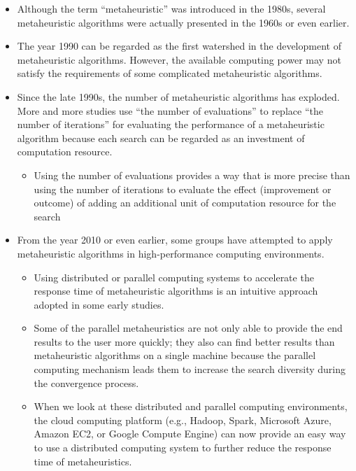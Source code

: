 \documentclass[
  letterpaper,
  DIV=11,
  numbers=noendperiod]{scrreprt}
\providecommand{\tightlist}{%
  \setlength{\itemsep}{0pt}\setlength{\parskip}{0pt}}\usepackage{longtable,booktabs,array}
\begin{document}
\begin{itemize}
\tightlist
\item
  Although the term ``metaheuristic'' was introduced in the 1980s,
  several metaheuristic algorithms were actually presented in the 1960s
  or even earlier.
\item
  The year 1990 can be regarded as the first watershed in the
  development of metaheuristic algorithms. However, the available
  computing power may not satisfy the requirements of some complicated
  metaheuristic algorithms.
\item
  Since the late 1990s, the number of metaheuristic algorithms has
  exploded. More and more studies use ``the number of evaluations'' to
  replace ``the number of iterations'' for evaluating the performance of
  a metaheuristic algorithm because each search can be regarded as an
  investment of computation resource.

  \begin{itemize}
  \tightlist
  \item
    Using the number of evaluations provides a way that is more precise
    than using the number of iterations to evaluate the effect
    (improvement or outcome) of adding an additional unit of computation
    resource for the search
  \end{itemize}
\item
  From the year 2010 or even earlier, some groups have attempted to
  apply metaheuristic algorithms in high-performance computing
  environments.

  \begin{itemize}
  \tightlist
  \item
    Using distributed or parallel computing systems to accelerate the
    response time of metaheuristic algorithms is an intuitive approach
    adopted in some early studies.
  \item
    Some of the parallel metaheuristics are not only able to provide the
    end results to the user more quickly; they also can find better
    results than metaheuristic algorithms on a single machine because
    the parallel computing mechanism leads them to increase the search
    diversity during the convergence process.
  \item
    When we look at these distributed and parallel computing
    environments, the cloud computing platform (e.g., Hadoop, Spark,
    Microsoft Azure, Amazon EC2, or Google Compute Engine) can now
    provide an easy way to use a distributed computing system to further
    reduce the response time of metaheuristics.
  \end{itemize}
\end{itemize}
\end{document}
